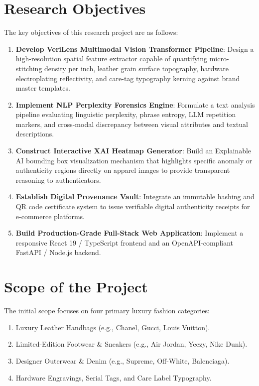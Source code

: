\section{Research Objectives}
The key objectives of this research project are as follows:
\begin{enumerate}
    \item \textbf{Develop VeriLens Multimodal Vision Transformer Pipeline}: Design a high-resolution spatial feature extractor capable of quantifying micro-stitching density per inch, leather grain surface topography, hardware electroplating reflectivity, and care-tag typography kerning against brand master templates.
    \item \textbf{Implement NLP Perplexity Forensics Engine}: Formulate a text analysis pipeline evaluating linguistic perplexity, phrase entropy, LLM repetition markers, and cross-modal discrepancy between visual attributes and textual descriptions.
    \item \textbf{Construct Interactive XAI Heatmap Generator}: Build an Explainable AI bounding box visualization mechanism that highlights specific anomaly or authenticity regions directly on apparel images to provide transparent reasoning to authenticators.
    \item \textbf{Establish Digital Provenance Vault}: Integrate an immutable hashing and QR code certificate system to issue verifiable digital authenticity receipts for e-commerce platforms.
    \item \textbf{Build Production-Grade Full-Stack Web Application}: Implement a responsive React 19 / TypeScript frontend and an OpenAPI-compliant FastAPI / Node.js backend.
\end{enumerate}

\section{Scope of the Project}
The initial scope focuses on four primary luxury fashion categories:
\begin{enumerate}
    \item Luxury Leather Handbags (e.g., Chanel, Gucci, Louis Vuitton).
    \item Limited-Edition Footwear \& Sneakers (e.g., Air Jordan, Yeezy, Nike Dunk).
    \item Designer Outerwear \& Denim (e.g., Supreme, Off-White, Balenciaga).
    \item Hardware Engravings, Serial Tags, and Care Label Typography.
\end{enumerate}

